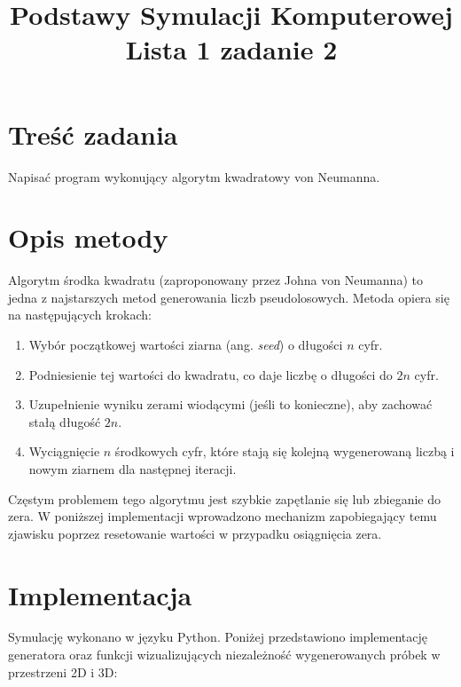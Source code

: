 \documentclass[11pt, a4paper]{article}
\title{\textbf{Podstawy Symulacji Komputerowej} \\ Lista 1 zadanie 2}
\author{}
\date{}
\begin{document}
\maketitle

\section*{Treść zadania}
Napisać program wykonujący algorytm kwadratowy von Neumanna.

\section*{Opis metody}
Algorytm środka kwadratu (zaproponowany przez Johna von Neumanna) to jedna z najstarszych metod generowania liczb pseudolosowych. Metoda opiera się na następujących krokach:
\begin{enumerate}
    \item Wybór początkowej wartości ziarna (ang. \textit{seed}) o długości $n$ cyfr.
    \item Podniesienie tej wartości do kwadratu, co daje liczbę o długości do $2n$ cyfr.
    \item Uzupełnienie wyniku zerami wiodącymi (jeśli to konieczne), aby zachować stałą długość $2n$.
    \item Wyciągnięcie $n$ środkowych cyfr, które stają się kolejną wygenerowaną liczbą i nowym ziarnem dla następnej iteracji.
\end{enumerate}
Częstym problemem tego algorytmu jest szybkie zapętlanie się lub zbieganie do zera. W poniższej implementacji wprowadzono mechanizm zapobiegający temu zjawisku poprzez resetowanie wartości w przypadku osiągnięcia zera.

\section*{Implementacja}
Symulację wykonano w języku Python. Poniżej przedstawiono implementację generatora oraz funkcji wizualizujących niezależność wygenerowanych próbek w przestrzeni 2D i 3D:
\end{document}
